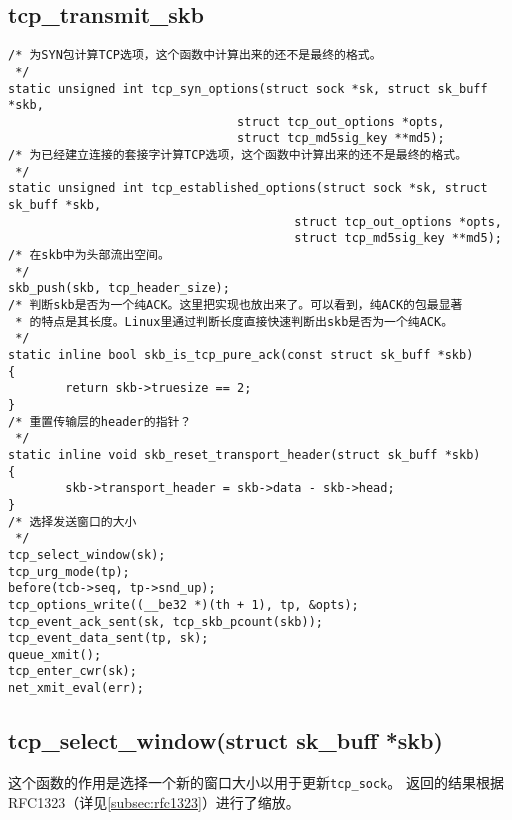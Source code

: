 \subsection{tcp\_transmit\_skb}

\begin{verbatim}
/* 为SYN包计算TCP选项，这个函数中计算出来的还不是最终的格式。
 */
static unsigned int tcp_syn_options(struct sock *sk, struct sk_buff *skb,
                                struct tcp_out_options *opts,
                                struct tcp_md5sig_key **md5);
/* 为已经建立连接的套接字计算TCP选项，这个函数中计算出来的还不是最终的格式。
 */
static unsigned int tcp_established_options(struct sock *sk, struct sk_buff *skb,
                                        struct tcp_out_options *opts,
                                        struct tcp_md5sig_key **md5);
/* 在skb中为头部流出空间。
 */
skb_push(skb, tcp_header_size);
/* 判断skb是否为一个纯ACK。这里把实现也放出来了。可以看到，纯ACK的包最显著
 * 的特点是其长度。Linux里通过判断长度直接快速判断出skb是否为一个纯ACK。
 */
static inline bool skb_is_tcp_pure_ack(const struct sk_buff *skb)
{
        return skb->truesize == 2;
}
/* 重置传输层的header的指针？
 */
static inline void skb_reset_transport_header(struct sk_buff *skb)
{
        skb->transport_header = skb->data - skb->head;
}
/* 选择发送窗口的大小
 */
tcp_select_window(sk);
tcp_urg_mode(tp);
before(tcb->seq, tp->snd_up);
tcp_options_write((__be32 *)(th + 1), tp, &opts);
tcp_event_ack_sent(sk, tcp_skb_pcount(skb));
tcp_event_data_sent(tp, sk);
queue_xmit();
tcp_enter_cwr(sk);
net_xmit_eval(err);
\end{verbatim}

\subsection{tcp\_select\_window(struct sk\_buff *skb)}
这个函数的作用是选择一个新的窗口大小以用于更新\texttt{tcp_sock}。
返回的结果根据RFC1323（详见\ref{subsec:rfc1323}）进行了缩放。

